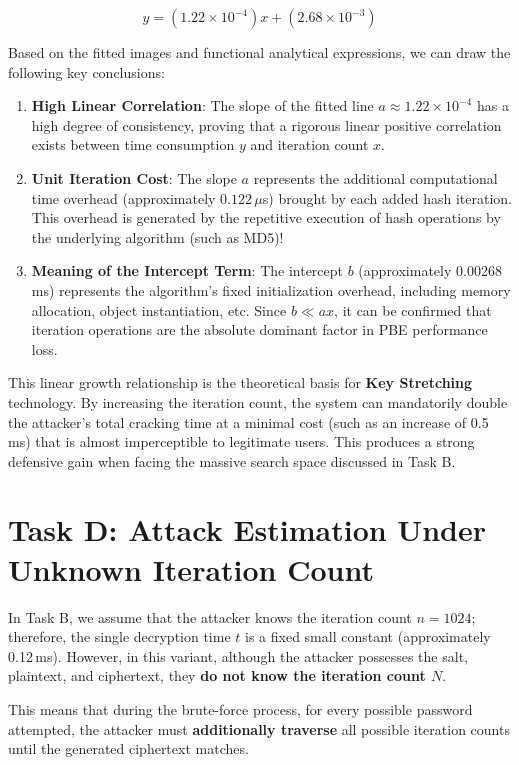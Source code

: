 \documentclass[12pt,a4paper]{article}
\begin{document}
\begin{equation}
y = (1.22 \times 10^{-4})x + (2.68 \times 10^{-3})
\end{equation}

Based on the fitted images and functional analytical expressions, we can draw the following key conclusions:

\begin{enumerate}
    \item \textbf{High Linear Correlation}: The slope of the fitted line $a \approx 1.22 \times 10^{-4}$ has a high degree of consistency, proving that a rigorous linear positive correlation exists between time consumption $y$ and iteration count $x$.
    \item \textbf{Unit Iteration Cost}: The slope $a$ represents the additional computational time overhead (approximately $0.122$\,$\mu$s) brought by each added hash iteration. This overhead is generated by the repetitive execution of hash operations by the underlying algorithm (such as MD5)!
    \item \textbf{Meaning of the Intercept Term}: The intercept $b$ (approximately 0.00268\,ms) represents the algorithm's fixed initialization overhead, including memory allocation,  object instantiation, etc. Since $b \ll ax$, it can be confirmed that iteration operations are the absolute dominant factor in PBE performance loss.
\end{enumerate}

This linear growth relationship is the theoretical basis for \textbf{Key Stretching} technology. By increasing the iteration count, the system can mandatorily double the attacker's total cracking time at a minimal cost (such as an increase of 0.5\,ms) that is almost imperceptible to legitimate users. This produces a strong defensive gain when facing the massive search space discussed in Task B.

\section{Task D: Attack Estimation Under Unknown Iteration Count}

In Task B, we assume that the attacker knows the iteration count $n=1024$; therefore, the single decryption time $t$ is a fixed small constant (approximately 0.12\,ms). However, in this variant, although the attacker possesses the salt, plaintext, and ciphertext, they \textbf{do not know the iteration count $N$}.

This means that during the brute-force process, for every possible password attempted, the attacker must \textbf{additionally traverse} all possible iteration counts until the generated ciphertext matches.
\end{document}
